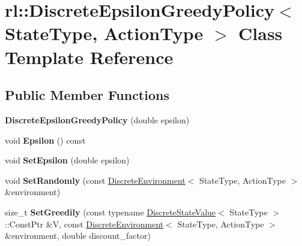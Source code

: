 \hypertarget{classrl_1_1_discrete_epsilon_greedy_policy}{}\section{rl\+:\+:Discrete\+Epsilon\+Greedy\+Policy$<$ State\+Type, Action\+Type $>$ Class Template Reference}
\label{classrl_1_1_discrete_epsilon_greedy_policy}
\subsection*{Public Member Functions}
\begin{DoxyCompactItemize}
\item 
\hypertarget{classrl_1_1_discrete_epsilon_greedy_policy_aa9d67bc59c160b060cb2fd4cc616fc66}{}\label{classrl_1_1_discrete_epsilon_greedy_policy_aa9d67bc59c160b060cb2fd4cc616fc66} 
{\bfseries Discrete\+Epsilon\+Greedy\+Policy} (double epsilon)
\item 
\hypertarget{classrl_1_1_discrete_epsilon_greedy_policy_a9559b1bfd5a8763e544a0aefd25f983d}{}\label{classrl_1_1_discrete_epsilon_greedy_policy_a9559b1bfd5a8763e544a0aefd25f983d} 
void {\bfseries Epsilon} () const
\item 
\hypertarget{classrl_1_1_discrete_epsilon_greedy_policy_aa9cef3d7f4c59af90a6f5edd8bcc8f2d}{}\label{classrl_1_1_discrete_epsilon_greedy_policy_aa9cef3d7f4c59af90a6f5edd8bcc8f2d} 
void {\bfseries Set\+Epsilon} (double epsilon)
\item 
\hypertarget{classrl_1_1_discrete_epsilon_greedy_policy_acc935a6aaee1988a35adcdcd1e5ed77c}{}\label{classrl_1_1_discrete_epsilon_greedy_policy_acc935a6aaee1988a35adcdcd1e5ed77c} 
void {\bfseries Set\+Randomly} (const \hyperlink{classrl_1_1_discrete_environment}{Discrete\+Environment}$<$ State\+Type, Action\+Type $>$ \&environment)
\item 
\hypertarget{classrl_1_1_discrete_epsilon_greedy_policy_a5dbcffbe61c91ad1a6ade8d3e51c572d}{}\label{classrl_1_1_discrete_epsilon_greedy_policy_a5dbcffbe61c91ad1a6ade8d3e51c572d} 
size\+\_\+t {\bfseries Set\+Greedily} (const typename \hyperlink{structrl_1_1_discrete_state_value}{Discrete\+State\+Value}$<$ State\+Type $>$\+::Const\+Ptr \&V, const \hyperlink{classrl_1_1_discrete_environment}{Discrete\+Environment}$<$ State\+Type, Action\+Type $>$ \&environment, double discount\+\_\+factor)
\item 
\hypertarget{classrl_1_1_discrete_epsilon_greedy_policy_a6d9264f4bf634832820ceae46436b028}{}\label{classrl_1_1_discrete_epsilon_greedy_policy_a6d9264f4bf634832820ceae46436b028} 

\end{DoxyCompactItemize}
